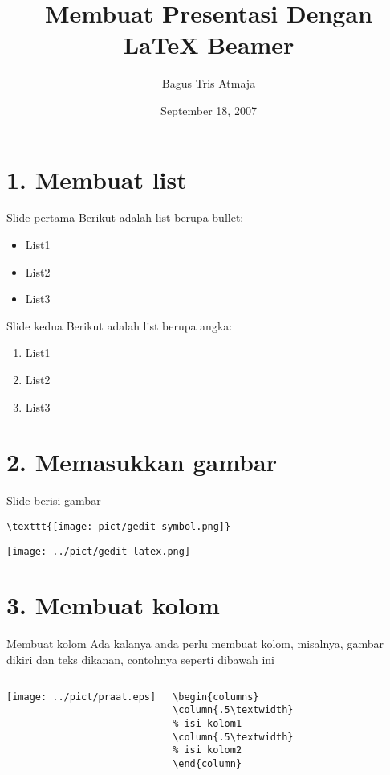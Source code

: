 \documentclass{beamer}
\author{Bagus Tris Atmaja}
\title{Membuat Presentasi Dengan \LaTeX{} Beamer}
\institute{Institut Teknologi Sepuluh Nopember}
\date{September 18, 2007}
\begin{document}
\begin{frame}[t,plain]
\titlepage
\end{frame}

	
\section {1. Membuat list}
\begin{frame}[t, fragile]{Slide pertama}
Berikut adalah list berupa bullet:
\begin{itemize}
\item List1
\item List2
\item List3
\end{itemize}
\end{frame}


\begin{frame}[t, fragile]{Slide kedua}
Berikut adalah list berupa angka:
\begin{enumerate}
\item List1
\item List2
\item List3
\end{enumerate}
\end{frame}

\section{2. Memasukkan gambar}
\begin{frame}[t, fragile]{Slide berisi gambar}
\begin{verbatim}
\texttt{[image: pict/gedit-symbol.png]}
\end{verbatim}
\texttt{[image: ../pict/gedit-latex.png]}
\end{frame}

\section{3. Membuat kolom}
\begin{frame}[t, fragile] {Membuat kolom}
Ada kalanya anda perlu membuat kolom, misalnya, gambar dikiri dan teks dikanan, contohnya seperti dibawah ini \\
\begin{columns}
\texttt{[image: ../pict/praat.eps]}
\begin{verbatim}
\begin{columns}
\column{.5\textwidth}
% isi kolom1
\column{.5\textwidth}
% isi kolom2
\end{column}
\end{verbatim}
\end{columns}
\end{frame}
\end{document}
